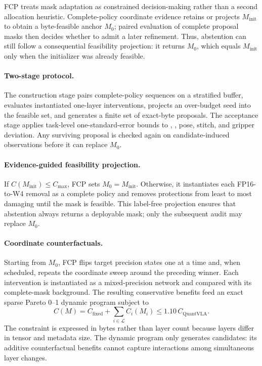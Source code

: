 FCP treats mask adaptation as constrained decision-making rather than a second allocation heuristic. Complete-policy coordinate evidence retains or projects $M_{\mathrm{init}}$ to obtain a byte-feasible anchor $M_0$; paired evaluation of complete proposal masks then decides whether to admit a later refinement. Thus, abstention can still follow a consequential feasibility projection: it returns $M_0$, which equals $M_{\mathrm{init}}$ only when the initializer was already feasible.

\paragraph{Two-stage protocol.}
The construction stage pairs complete-policy sequences on a stratified buffer, evaluates instantiated one-layer interventions, projects an over-budget seed into the feasible set, and generates a finite set of exact-byte proposals. The acceptance stage applies task-level one-standard-error bounds to \dpac, \dfunc, pose, stitch, and gripper deviation. Any surviving proposal is checked again on candidate-induced observations before it can replace $M_0$.

\paragraph{Evidence-guided feasibility projection.}
If $C(M_{\mathrm{init}})\le C_{\max}$, FCP sets $M_0=M_{\mathrm{init}}$. Otherwise, it instantiates each FP16-to-W4 removal as a complete policy and removes protections from least to most damaging until the mask is feasible. This label-free projection ensures that abstention always returns a deployable mask; only the subsequent audit may replace $M_0$.

\paragraph{Coordinate counterfactuals.}
Starting from $M_0$, FCP flips target precision states one at a time and, when scheduled, repeats the coordinate sweep around the preceding winner. Each intervention is instantiated as a mixed-precision network and compared with its complete-mask background. The resulting conservative benefits feed an exact sparse Pareto 0--1 dynamic program subject to
\begin{equation}
 C(M)=C_{\mathrm{fixed}}+\sum_{i\in\mathcal{L}}C_i(M_i)
 \le 1.10\,C_{\mathrm{QuantVLA}}.
 \label{eq:budget}
\end{equation}
The constraint is expressed in bytes rather than layer count because layers differ in tensor and metadata size. The dynamic program only generates candidates: its additive counterfactual benefits cannot capture interactions among simultaneous layer changes.

